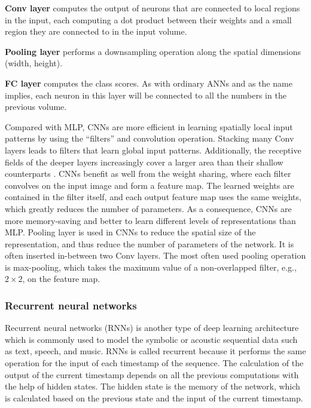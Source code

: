\noindent\textbf{Conv layer} computes the output of neurons that are connected to local regions in the input, each computing a dot product between their weights and a small region they are connected to in the input volume. 

\noindent\textbf{Pooling layer} performs a downsampling operation along the spatial dimensions (width, height).

\noindent\textbf{FC layer} computes the class scores. As with ordinary ANNs and as the name implies, each neuron in this layer will be connected to all the numbers in the previous volume.

Compared with \gls{MLP}, \gls{CNN}s are more efficient in learning spatially local input patterns by using the ``filters” and convolution operation. Stacking many \gls{Conv} layers leads to filters that learn global input patterns. Additionally, the receptive fields of the deeper layers increasingly cover a larger area than their shallow counterparts \cite{Wikipediaa}. \gls{CNN}s benefit as well from the weight sharing, where each filter convolves on the input image and form a feature map. The learned weights are contained in the filter itself, and each output feature map uses the same weights, which greatly reduces the number of parameters. As a consequence, \gls{CNN}s are more memory-saving and better to learn different levels of representations than \gls{MLP}.
Pooling layer is used in \gls{CNN}s to reduce the spatial size of the representation, and thus reduce the number of parameters of the network. It is often inserted in-between two \gls{Conv} layers. The most often used pooling operation is max-pooling, which takes the maximum value of a non-overlapped filter, e.g., $2\times2$, on the feature map. 

\subsubsection{Recurrent neural networks}\label{sec:ch2:rnn}

Recurrent neural networks (\gls{RNN}s) is another type of deep learning architecture which is commonly used to model the symbolic or acoustic sequential data such as text, speech, and music. \gls{RNN}s is called recurrent because it performs the same operation for the input of each timestamp of the sequence. The calculation of the output of the current timestamp depends on all the previous computations with the help of hidden states. The hidden state is the memory of the network, which is calculated based on the previous state and the input of the current timestamp. 

